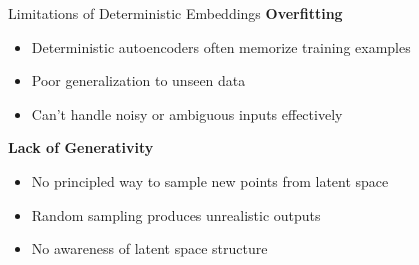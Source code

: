 \documentclass[5pt,aspectratio=169]{beamer}
\begin{document}
\begin{frame}

 \centering
    
\end{frame}

\begin{frame}{Limitations of Deterministic Embeddings}
  \textbf{Overfitting}
  \begin{itemize}
    \item Deterministic autoencoders often memorize training examples
    \item Poor generalization to unseen data
    \item Can't handle noisy or ambiguous inputs effectively
  \end{itemize}
  
  \textbf{Lack of Generativity}
  \begin{itemize}
    \item No principled way to sample new points from latent space
    \item Random sampling produces unrealistic outputs
    \item No awareness of latent space structure
  \end{itemize}
\end{frame}
\end{document}
